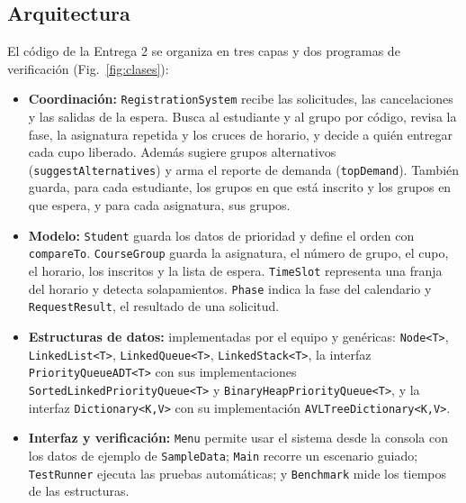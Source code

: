 \documentclass[conference]{IEEEtran}
\begin{document}
\subsection{Arquitectura}
El código de la Entrega 2 se organiza en tres capas y dos programas de verificación (Fig.~\ref{fig:clases}):
\begin{itemize}
    \item \textbf{Coordinación:} \texttt{RegistrationSystem} recibe las solicitudes, las cancelaciones y las salidas de la espera. Busca al estudiante y al grupo por código, revisa la fase, la asignatura repetida y los cruces de horario, y decide a quién entregar cada cupo liberado. Además sugiere grupos alternativos (\texttt{suggestAlternatives}) y arma el reporte de demanda (\texttt{topDemand}). También guarda, para cada estudiante, los grupos en que está inscrito y los grupos en que espera, y para cada asignatura, sus grupos.
    \item \textbf{Modelo:} \texttt{Student} guarda los datos de prioridad y define el orden con \texttt{compareTo}. \texttt{CourseGroup} guarda la asignatura, el número de grupo, el cupo, el horario, los inscritos y la lista de espera. \texttt{TimeSlot} representa una franja del horario y detecta solapamientos. \texttt{Phase} indica la fase del calendario y \texttt{RequestResult}, el resultado de una solicitud.
    \item \textbf{Estructuras de datos:} implementadas por el equipo y genéricas: \texttt{Node<T>}, \texttt{LinkedList<T>}, \texttt{LinkedQueue<T>}, \texttt{LinkedStack<T>}, la interfaz \texttt{PriorityQueueADT<T>} con sus implementaciones \texttt{SortedLinkedPriorityQueue<T>} y \texttt{BinaryHeapPriorityQueue<T>}, y la interfaz \texttt{Dictionary<K,V>} con su implementación \texttt{AVLTreeDictionary<K,V>}.
    \item \textbf{Interfaz y verificación:} \texttt{Menu} permite usar el sistema desde la consola con los datos de ejemplo de \texttt{SampleData}; \texttt{Main} recorre un escenario guiado; \texttt{TestRunner} ejecuta las pruebas automáticas; y \texttt{Benchmark} mide los tiempos de las estructuras.
\end{itemize}
\end{document}
